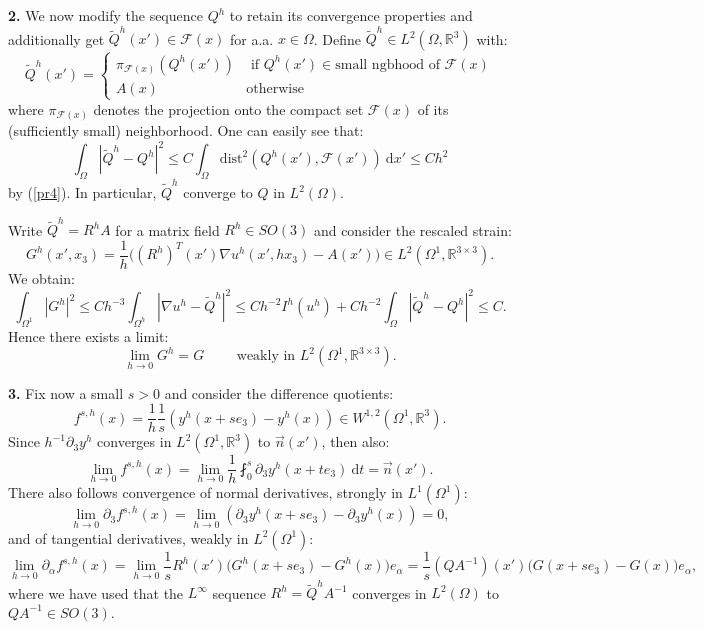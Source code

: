 \documentclass[leqno,twoside, 11pt]{amsart}
\theoremstyle{plain}
\theoremstyle{definition}
\numberwithin{equation}{section}
\numberwithin{figure}{section}
\begin{document}
\medskip

{\bf 2.} We now modify the sequence $Q^h$ to retain its convergence properties
and additionally get $\tilde Q^h(x')\in\mathcal{F}(x)$ for a.a. $x\in \Omega$.
Define $\tilde Q^h\in L^2(\Omega,\mathbb{R}^3)$ with:
$$ \tilde Q^h(x') = \left\{\begin{array}{ll}
\pi_{\mathcal{F}(x)}(Q^h(x'))  & \mbox{ if } Q^h(x')\in 
\mbox{small ngbhood of } \mathcal{F}(x)\\
A(x) & \mbox{otherwise}\end{array}
\right.$$
where $\pi_{\mathcal{F}(x)}$ denotes the projection onto the compact set 
$\mathcal{F}(x)$ of its (sufficiently small) neighborhood.
One can easily see that:
$$\int_{\Omega}|\tilde Q^h - Q^h|^2\leq 
C\int_\Omega\mbox{dist}^2(Q^h(x'),\mathcal{F}(x'))~\mbox{d}x'\leq Ch^2$$
by (\ref{pr4}).  In particular, $\tilde Q^h$ converge to $Q$
in $L^2(\Omega)$.

Write $\tilde Q^h = R^hA$ for a matrix field $R^h\in SO(3)$ and consider
the rescaled strain:
$$ G^h (x',x_3) = \frac{1}{h} \Big((R^h)^T(x')\nabla u^h(x', hx_3) - A(x')\Big)
\in L^2(\Omega^1,\mathbb{R}^{3\times 3}).$$
We obtain:
$$\int_{\Omega^1}|G^h|^2 \leq Ch^{-3} \int_{\Omega^h} |\nabla u^h - \tilde Q^h|^2
\leq Ch^{-2}I^h(u^h) + Ch^{-2}\int_{\Omega}|\tilde Q^h - Q^h|^2 \leq C.$$
Hence there exists a limit:
\begin{equation}\label{pr4.5}
\lim_{h\to 0} G^h = G \qquad 
\mbox{ weakly in } L^2(\Omega^1,\mathbb{R}^{3\times 3}).
\end{equation}

\medskip

{\bf 3.} Fix now a small $s>0$ and consider the difference quotients:
$$f^{s,h}(x) = \frac{1}{h}\frac{1}{s} (y^h(x+se_3) - y^h(x)) 
\in W^{1,2}(\Omega^1,\mathbb{R}^3).$$
Since $h^{-1}\partial_3 y^h$ converges in $L^2(\Omega^1,\mathbb{R}^3)$
to $\vec n(x')$, then also:
$$\lim_{h\to 0}f^{s,h}(x) = \lim_{h\to 0}\frac{1}{h}\fint_0^s
\partial_3 y^h(x+te_3)~\mbox{d}t = \vec n(x').$$
There also follows convergence of normal derivatives, strongly in $L^1(\Omega^1)$:
$$\lim_{h\to 0}\partial_3 f^{s,h}(x) 
= \lim_{h\to 0} (\partial_3 y^h(x+se_3) - \partial_3y^h(x)) = 0,$$
and of tangential derivatives, weakly in $L^2(\Omega^1)$:
$$\lim_{h\to 0} \partial_\alpha f^{s,h}(x) =
\lim_{h\to 0} \frac{1}{s} R^h(x') \Big(G^h(x+se_3) - G^h(x)\Big)e_\alpha=
\frac{1}{s} (QA^{-1})(x') \Big(G(x+se_3) - G(x)\Big)e_\alpha, $$
where we have used that the $L^\infty$ sequence $R^h=\tilde Q^h A^{-1}$
converges in $L^2(\Omega)$ to $QA^{-1}\in SO(3)$.
\end{document}
